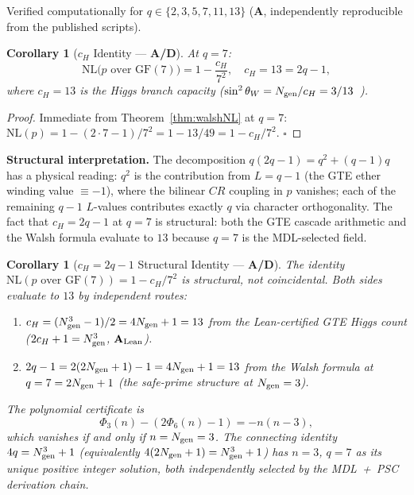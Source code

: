 \documentclass[11pt]{article}
\newtheorem{corollary}[theorem]{Corollary}
\theoremstyle{remark}
\newcommand{\GF}[1]{\ensuremath{\mathrm{GF}(#1)}}
\newcommand{\CatA}{\textbf{A}}
\newcommand{\CatAL}{\texorpdfstring{\ensuremath{\textbf{A}_{\rm Lean}}}{A-Lean}}
\newcommand{\CatAD}{\textbf{A/D}}
\begin{document}
Verified computationally for $q \in \{2,3,5,7,11,13\}$ (\CatA{}, independently
reproducible from the published scripts).

\begin{corollary}[$c_H$ Identity --- \CatAD{}]
\label{cor:cH-nl}
At $q = 7$:
\[
  \mathrm{NL}\bigl(p \text{ over } \GF{7}\bigr) = 1 - \frac{c_H}{7^2},
  \quad c_H = 13 = 2q-1,
\]
where $c_H = 13$ is the Higgs branch capacity
($\sin^2\theta_W = N_{\rm gen}/c_H = 3/13$~\cite{SpivackCMCA,SpivackCompleteness}).
\end{corollary}

\begin{proof}
Immediate from Theorem~\ref{thm:walshNL} at $q = 7$:
$\mathrm{NL}(p) = 1 - (2\cdot7-1)/7^2 = 1 - 13/49 = 1 - c_H/7^2$. $\square$
\end{proof}

\noindent\textbf{Structural interpretation.}
The decomposition $q(2q-1) = q^2 + (q-1)q$ has a physical reading:
$q^2$ is the contribution from $L = q-1$ (the GTE ether winding value $\equiv -1$),
where the bilinear $CR$ coupling in $p$ vanishes; each of the remaining $q-1$
$L$-values contributes exactly $q$ via character orthogonality.
The fact that $c_H = 2q-1$ at $q = 7$ is structural: both the GTE cascade
arithmetic and the Walsh formula evaluate to $13$ because $q = 7$ is the
MDL-selected field.

\begin{corollary}[$c_H = 2q-1$ Structural Identity --- \CatAD{}]
\label{cor:cH-structural}
The identity $\mathrm{NL}(p \text{ over } \GF{7}) = 1 - c_H/7^2$ is structural,
not coincidental. Both sides evaluate to $13$ by independent routes:
\begin{enumerate}[leftmargin=2em,itemsep=2pt,topsep=2pt]
  \item $c_H = (N_{\rm gen}^3-1)/2 = 4N_{\rm gen}+1 = 13$ from the Lean-certified
    GTE Higgs count ($2c_H + 1 = N_{\rm gen}^3$, \CatAL{}).
  \item $2q-1 = 2(2N_{\rm gen}+1)-1 = 4N_{\rm gen}+1 = 13$ from the Walsh formula
    at $q = 7 = 2N_{\rm gen}+1$ (the safe-prime structure at $N_{\rm gen} = 3$).
\end{enumerate}
The polynomial certificate is
\[
  \Phi_3(n) - (2\Phi_6(n)-1) = -n(n-3),
\]
which vanishes if and only if $n = N_{\rm gen} = 3$. The connecting identity
$4q = N_{\rm gen}^3 + 1$ (equivalently $4(2N_{\rm gen}+1) = N_{\rm gen}^3 + 1$)
has $n = 3$, $q = 7$ as its unique positive integer solution, both independently
selected by the MDL~+~PSC derivation chain.
\end{corollary}
\end{document}
